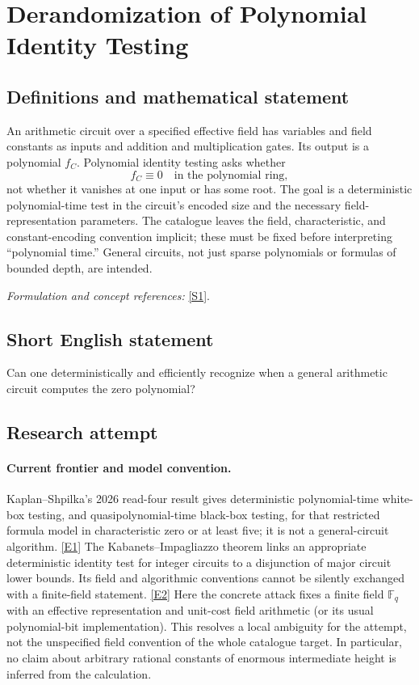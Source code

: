 \documentclass[11pt,a4paper]{article}
\numberwithin{equation}{section}
\newcommand{\F}{\mathbb{F}}
\newcommand{\sref}[2]{\hyperlink{source:#1:#2}{[S#2]}}
\newcommand{\eref}[2]{\hyperlink{extra:#1:#2}{[E#2]}}
\newif\ifshowcatalogue
\newcommand{\cataloguescope}[1]{\ifshowcatalogue
 \paragraph{Exact scope in the supplied catalogue.}
 \begin{quote}\small #1\end{quote}\fi}
\begin{document}
\setcounter{section}{0}
\section*{\texorpdfstring{Derandomization of Polynomial Identity Testing}{Derandomization of Polynomial Identity Testing}}\label{30006708}
\subsection{Definitions and mathematical statement}
An arithmetic circuit over a specified effective field has variables and field constants as inputs and addition and multiplication gates. Its output is a polynomial $f_C$. Polynomial identity testing asks whether
\[
 f_C\equiv0\quad\text{in the polynomial ring},
\]
not whether it vanishes at one input or has some root. The goal is a deterministic polynomial-time test in the circuit's encoded size and the necessary field-representation parameters. The catalogue leaves the field, characteristic, and constant-encoding convention implicit; these must be fixed before interpreting ``polynomial time.'' General circuits, not just sparse polynomials or formulas of bounded depth, are intended.
\par\smallskip\textit{Formulation and concept references:} \sref{30006708}{1}.
\cataloguescope{Determine whether polynomial identity testing for arithmetic circuits (deciding whether a given arithmetic circuit computes the identically zero polynomial) can be derandomized into deterministic polynomial time.}
\subsection{Short English statement}
Can one deterministically and efficiently recognize when a general arithmetic circuit computes the zero polynomial?
\subsection{Research attempt}

\paragraph{Current frontier and model convention.}
Kaplan--Shpilka's 2026 read-four result gives deterministic polynomial-time
white-box testing, and quasipolynomial-time black-box testing, for that
restricted formula model in characteristic zero or at least five; it is
not a general-circuit algorithm. \eref{30006708}{1}
The Kabanets--Impagliazzo theorem links an appropriate deterministic
identity test for integer circuits to a disjunction of major circuit lower
bounds. Its field and algorithmic conventions cannot be silently exchanged
with a finite-field statement. \eref{30006708}{2}
Here the concrete attack fixes a finite field $\F_q$ with an effective
representation and unit-cost field arithmetic (or its usual polynomial-bit
implementation). This resolves a local ambiguity for the attempt, not the
unspecified field convention of the whole catalogue target. In particular,
no claim about arbitrary rational constants of enormous intermediate height
is inferred from the calculation.
\end{document}
